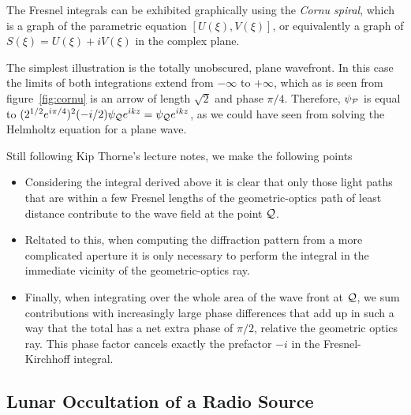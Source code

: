\documentclass{article}
\begin{document}
The Fresnel integrals can be exhibited graphically using the {\it Cornu spiral},
which is a graph of the parametric equation $[U(\xi),V(\xi)]$, or equivalently
a graph of $S(\xi)=U(\xi)+iV(\xi)$ in the complex plane. 

The simplest illustration is the totally unobscured, plane wavefront. In this
case the limits of both integrations extend from $-\infty$ to $+\infty$, which
as is seen from figure~\ref{fig:cornu} is an arrow of length $\sqrt{2}$ and 
phase
$\pi/4$. Therefore, $\psi_{\cal P}$ is equal to 
$(2^{1/2}e^{i\pi/4})^2({-i/2})\psi_{\cal Q}e^{ikz}=\psi_{\cal Q}e^{ikz}$, as we 
could have seen from solving the Helmholtz equation for a plane wave.

Still following Kip Thorne's lecture notes, we make the following points

\begin{itemize}
\item Considering the integral derived above it is clear that only those light paths that 
are within a few Fresnel lengths of the geometric-optics path of least distance contribute
to the wave field at the point $\cal{Q}$.
\item Reltated to this, when computing the diffraction pattern from a more complicated 
aperture it is only necessary to perform the integral in the immediate vicinity of the 
geometric-optics ray. 
\item Finally, when integrating over the whole area of the wave front at $\cal{Q}$, we sum 
contributions with increasingly large phase differences that add up in such a way that the 
total has a net extra phase of $\pi/2$, relative the geometric optics ray. This phase factor
cancels exactly the prefactor $-i$ in the Fresnel-Kirchhoff integral.
\end{itemize}

\subsection{Lunar Occultation of a Radio Source}
\end{document}
